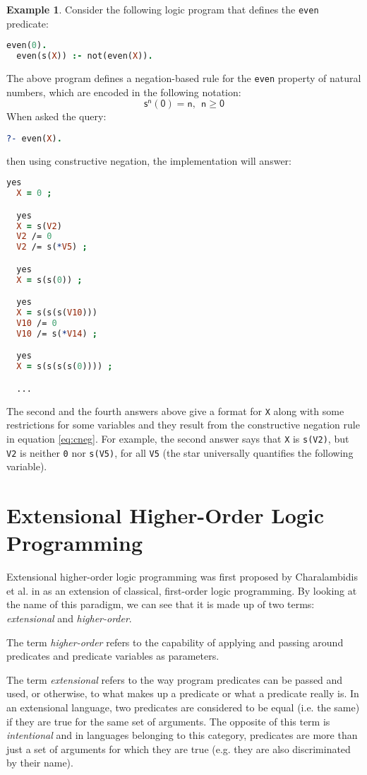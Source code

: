 \documentclass[inscr,ack,preface]{dithesis}
\theoremstyle{definition}
\newtheorem{example}{Example}[chapter]
\begin{document}
\begin{example} Consider the following logic program that defines the \texttt{even} predicate:
\begin{lstlisting}[language=Prolog,frame=single]
  even(0).
  even(s(X)) :- not(even(X)).
\end{lstlisting}
\end{example}
The above program defines a negation-based rule for the \texttt{even} property of natural numbers, which are encoded in the following notation:
\[
  \mathsf{s^{n}(0) = n, ~~ n \ge 0}
\]
When asked the query:
\begin{lstlisting}[language=Prolog,frame=single]
  ?- even(X).
\end{lstlisting}
then using constructive negation, the implementation will answer:
\begin{lstlisting}[language=Prolog,frame=single]
  yes
  X = 0 ;

  yes
  X = s(V2)
  V2 /= 0
  V2 /= s(*V5) ;

  yes
  X = s(s(0)) ;

  yes
  X = s(s(s(V10)))
  V10 /= 0
  V10 /= s(*V14) ;

  yes
  X = s(s(s(s(0)))) ;

  ...
\end{lstlisting}
The second and the fourth answers above give a format for \texttt{X} along with some restrictions for some variables and they result from the constructive negation rule in equation \ref{eq:cneg}. For example, the second answer says that \texttt{X} is \texttt{s(V2)}, but \texttt{V2} is neither \texttt{0} nor \texttt{s(V5)}, for all \texttt{V5} (the star universally quantifies the following variable).


\section{Extensional Higher-Order Logic Programming}
Extensional higher-order logic programming was first proposed by Charalambidis et al. in \cite{DBLP:journals/tocl/CharalambidisHRW13} as an extension of classical, first-order logic programming. By looking at the name of this paradigm, we can see that it is made up of two terms: \emph{extensional} and \emph{higher-order}.

The term \emph{higher-order} refers to the capability of applying and passing around predicates and predicate variables as parameters.

The term \emph{extensional} refers to the way program predicates can be passed and used, or otherwise, to what makes up a predicate or what a predicate really is. In an extensional language, two predicates are considered to be equal (i.e. the same) if they are true for the same set of arguments. The opposite of this term is \emph{intentional} and in languages belonging to this category, predicates are more than just a set of arguments for which they are true (e.g. they are also discriminated by their name).
\end{document}
